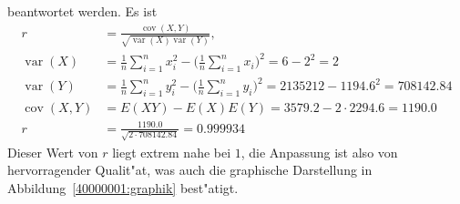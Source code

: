 \begin{loesung}
\begin{teilaufgaben}
beantwortet werden.
Es ist
\begin{align*}
r&=\frac{\operatorname{cov}(X,Y)}{\sqrt{\operatorname{var}(X)\operatorname{var}(Y)}},
\\
\operatorname{var}(X)
&=
\frac1n\sum_{i=1}^nx_i^2-\biggl(\frac1n\sum_{i=1}^nx_i\biggr)^2
=
6-2^2=2
\\
\operatorname{var}(Y)
&=
\frac1n\sum_{i=1}^ny_i^2-\biggl(\frac1n\sum_{i=1}^ny_i\biggr)^2
=
2135212-1194.6^2=708142.84
\\
\operatorname{cov}(X,Y)
&=
E(XY)-E(X)E(Y)=3579.2-2\cdot 2294.6=1190.0
\\
r&=\frac{1190.0}{\sqrt{2\cdot 708142.84}}=0.999934
\end{align*}
Dieser Wert von $r$ liegt extrem nahe bei $1$, die Anpassung ist also von
hervorragender Qualit"at, was auch die graphische Darstellung
in Abbildung~\ref{40000001:graphik} best"atigt.
\qedhere
\end{teilaufgaben}
\end{loesung}
